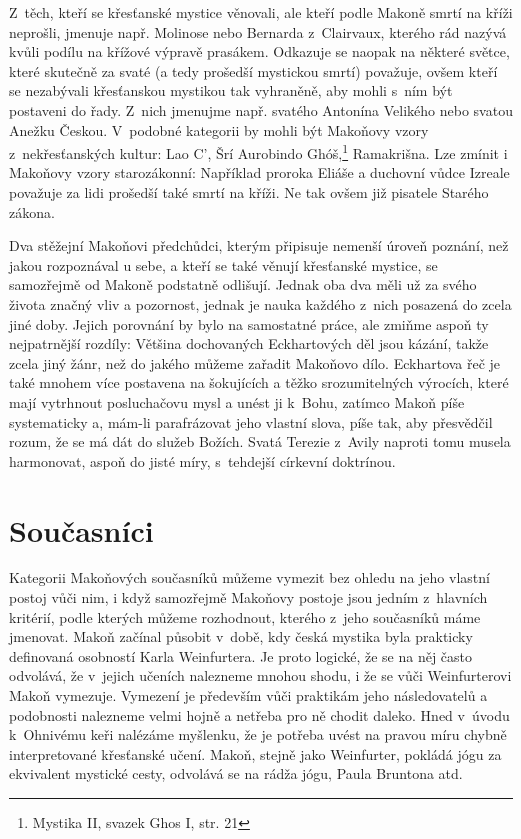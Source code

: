 Z~těch, kteří se křesťanské mystice věnovali, ale kteří podle Makoně smrtí na
kříži neprošli, jmenuje např. Molinose nebo Bernarda z~Clairvaux, kterého rád
nazývá kvůli podílu na křížové výpravě prasákem. Odkazuje se naopak na některé
světce, které skutečně za svaté (a tedy prošedší mystickou smrtí) považuje, ovšem
kteří se nezabývali křesťanskou mystikou tak vyhraněně, aby mohli s~ním být
postaveni do řady. Z~nich jmenujme např. svatého Antonína
Velikého nebo svatou
Anežku Českou. V~podobné kategorii by mohli být Makoňovy vzory z~nekřesťanských
kultur: Lao C', Šrí Aurobindo Ghóš,\footnote{Mystika II,
svazek Ghos I, str. 21} Ramakrišna. Lze zmínit i Makoňovy vzory
starozákonní: Například proroka Eliáše a duchovní vůdce
Izreale považuje za lidi prošedší také smrtí na kříži. Ne tak ovšem již pisatele
Starého zákona.

Dva stěžejní Makoňovi předchůdci, kterým připisuje nemenší úroveň poznání, než jakou
rozpoznával u sebe, a kteří se také věnují křesťanské mystice, se samozřejmě od
Makoně podstatně odlišují. Jednak oba dva měli už za svého života značný vliv a
pozornost,\cite{hackett2012companion}\cite{britannicaTeresa} jednak je nauka každého z~nich posazená do zcela jiné doby. Jejich
porovnání by bylo na samostatné práce, ale zmiňme aspoň ty nejpatrnější rozdíly:
Většina dochovaných Eckhartových děl jsou kázání, takže zcela jiný žánr, než do
jakého můžeme zařadit Makoňovo dílo. Eckhartova řeč je také mnohem více
postavena na šokujících a těžko srozumitelných výrocích, které mají vytrhnout
posluchačovu mysl a unést ji k~Bohu,\cite{landauer1978eckhart} zatímco Makoň píše systematicky a, mám-li
parafrázovat jeho vlastní slova, píše tak, aby přesvědčil rozum, že se má dát do služeb
Božích. Svatá Terezie z~Avily naproti tomu musela harmonovat, aspoň do jisté
míry, s~tehdejší církevní doktrínou.\cite{eire2019life}

\section{Současníci}

Kategorii Makoňových současníků můžeme vymezit bez ohledu na jeho vlastní postoj
vůči nim, i když samozřejmě Makoňovy postoje jsou jedním z~hlavních kritérií,
podle kterých můžeme rozhodnout, kterého z~jeho současníků máme jmenovat. Makoň
začínal působit v~době, kdy česká mystika byla prakticky definovaná osobností
Karla Weinfurtera.\cite{sanitrak2006dejiny1} Je proto logické, že se na něj
často odvolává, že v~jejich učeních nalezneme mnohou shodu, i že se vůči
Weinfurterovi Makoň vymezuje. Vymezení je především vůči praktikám jeho
následovatelů a podobnosti nalezneme velmi hojně a netřeba pro ně chodit
daleko. Hned v~úvodu k~Ohnivému keři\cite{weinfurter1923ohnivy} nalézáme
myšlenku, že je potřeba uvést na pravou míru chybně interpretované křesťanské
učení. Makoň, stejně jako Weinfurter, pokládá jógu za ekvivalent mystické cesty,
odvolává se na rádža jógu, Paula Bruntona atd.

